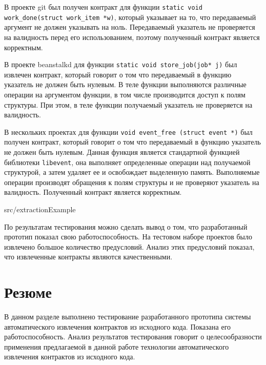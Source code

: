 В проекте git был получен контракт для функции \texttt{static void work_done(struct work_item *w)}, который указывает на то, что передаваемый аргумент не должен указывать на ноль. Передаваемый указатель не проверяется на валидность перед его использованием, поэтому полученный контракт является корректным.

В проекте beanstalkd для функции \texttt{static void store_job(job* j)} был извлечен контракт, который говорит о том что передаваемый в функцию указатель не должен быть нулевым. В теле функции выполняются различные операции на аргументом функции, в том числе производится доступ к полям структуры. При этом, в теле функции получаемый указатель не проверяется на валидность.

В нескольких проектах для функции \texttt{void event_free (struct event *)} был получен контракт, который говорит о том что передаваемый в функцию указатель не должен быть нулевым. Данная функция является стандартной функцией библиотеки \texttt{libevent}, она выполняет определенные операции над получаемой структурой, а затем удаляет ее и освобождает выделенную память. Выполняемые операции производят обращения к полям структуры и не проверяют указатель на валидность. Полученный контракт является корректным.

{src/extractionExample}

По результатам тестирования можно сделать вывод о том, что разработанный прототип показал свою работоспособность. На тестовом наборе проектов было извлечено большое количество предусловий. Анализ этих предусловий показал, что извлеченные контракты являются качественными.

\section{Резюме}
В данном разделе выполнено тестирование разработанного прототипа системы автоматического извлечения контрактов из исходного кода. Показана его работоспособность. Анализ результатов тестирования говорит о целесообразности применения предлагаемой в данной работе технологии автоматического извлечения контрактов из исходного кода.